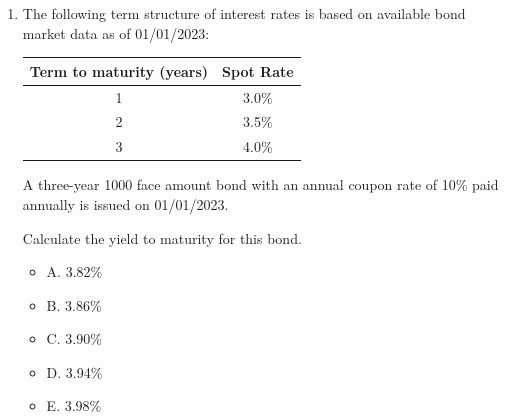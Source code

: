 \documentclass[11pt]{article}
\begin{document}
\begin{enumerate}[label=\textbf{\arabic*.}]
\medskip
\hrule
\medskip


\item The following term structure of interest rates is based on available bond market data as of 01/01/2023:

\begin{center}
\begin{tabular}{cc}
\toprule
Term to maturity (years) & Spot Rate \\
\midrule
1 & 3.0\% \\
2 & 3.5\% \\
3 & 4.0\% \\
\bottomrule
\end{tabular}
\end{center}

A three-year 1000 face amount bond with an annual coupon rate of 10\% paid annually is issued on 01/01/2023.

Calculate the yield to maturity for this bond.

\begin{itemize}
\item A. 3.82\%
\item B. 3.86\%
\item C. 3.90\%
\item D. 3.94\%
\item E. 3.98\%
\end{itemize}

\end{enumerate}
\end{document}
